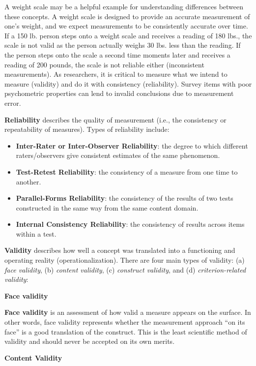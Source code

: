 \documentclass[
]{book}
\providecommand{\tightlist}{%
  \setlength{\itemsep}{0pt}\setlength{\parskip}{0pt}}
\begin{document}
A weight scale may be a helpful example for understanding differences between these concepts. A weight scale is designed to provide an accurate measurement of one's weight, and we expect measurements to be consistently accurate over time. If a 150 lb. person steps onto a weight scale and receives a reading of 180 lbs., the scale is not valid as the person actually weighs 30 lbs. less than the reading. If the person steps onto the scale a second time moments later and receives a reading of 200 pounds, the scale is not reliable either (inconsistent measurements). As researchers, it is critical to measure what we intend to measure (validity) and do it with consistency (reliability). Survey items with poor psychometric properties can lend to invalid conclusions due to measurement error.

\textbf{Reliability} describes the quality of measurement (i.e., the consistency or repeatability of measures). Types of reliability include:

\begin{itemize}
\tightlist
\item
  \textbf{Inter-Rater or Inter-Observer Reliability}: the degree to which different raters/observers give consistent estimates of the same phenomenon.
\item
  \textbf{Test-Retest Reliability}: the consistency of a measure from one time to another.
\item
  \textbf{Parallel-Forms Reliability}: the consistency of the results of two tests constructed in the same way from the same content domain.
\item
  \textbf{Internal Consistency Reliability}: the consistency of results across items within a test.
\end{itemize}

\textbf{Validity} describes how well a concept was translated into a functioning and operating reality (operationalization). There are four main types of validity: (a) \emph{face validity}, (b) \emph{content validity}, (c) \emph{construct validity}, and (d) \emph{criterion-related validity}:

\textbf{Face validity}

\textbf{Face validity} is an assessment of how valid a measure appears on the surface. In other words, face validity represents whether the measurement approach ``on its face'' is a good translation of the construct. This is the least scientific method of validity and should never be accepted on its own merits.

\textbf{Content Validity}
\end{document}
